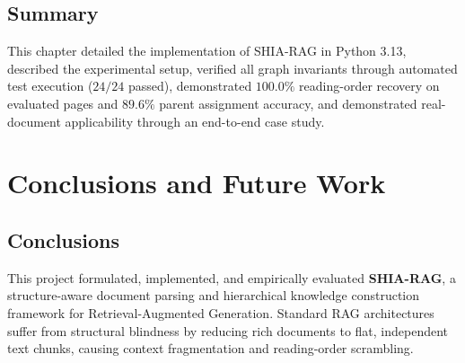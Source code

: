 \documentclass[12pt,a4paper]{report}
\begin{document}
\begin{table}[h!]
\centering
\caption{Empirical Sensitivity Analysis of Key Hyperparameters}
\label{tab:sensitivity_analysis}
\end{table}

\section{Summary}
This chapter detailed the implementation of SHIA-RAG in Python 3.13, described the experimental setup, verified all graph invariants through automated test execution ($24/24$ passed), demonstrated $100.0\%$ reading-order recovery on evaluated pages and $89.6\%$ parent assignment accuracy, and demonstrated real-document applicability through an end-to-end case study.

\chapter{Conclusions and Future Work}

\section{Conclusions}
This project formulated, implemented, and empirically evaluated \textbf{SHIA-RAG}, a structure-aware document parsing and hierarchical knowledge construction framework for Retrieval-Augmented Generation. Standard RAG architectures suffer from structural blindness by reducing rich documents to flat, independent text chunks, causing context fragmentation and reading-order scrambling.
\end{document}

